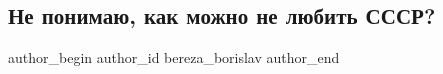 
 
 
 
 
 
\subsection{Не понимаю, как можно не любить СССР?}
\label{sec:29_08_2021.fb.bereza_borislav.1.sssr_ljubov}
 
\ifcmt
 author_begin
   author_id bereza_borislav
 author_end
\fi

